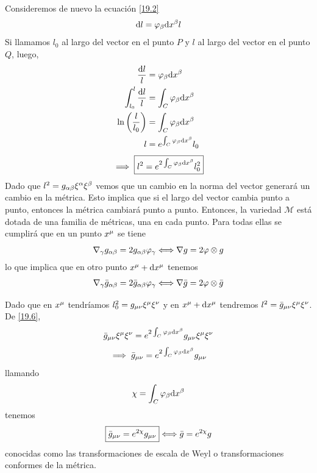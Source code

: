 Consideremos de nuevo la ecuación \eqref{19.2}
\begin{equation}\label{19.2}
  \dd l= \varphi_\beta \dd x^\beta l
\end{equation}
Si llamamos $l_0$ al largo del vector en el punto $P$ y $l$ al largo del vector en el punto $Q$, luego,
\begin{align}
  \frac{\dd l}{l}&=\varphi_\beta \dd x^\beta \\
  \int_{l_0}^l\frac{\dd l}{l}&=\int_C\varphi_\beta \dd x^\beta \\
  \ln\left(\frac{l}{l_0}\right)&=\int_C\varphi_\beta \dd x^\beta \\
  l&=e^{\int_C\varphi_\beta \dd x^\beta }l_0
\end{align}
\begin{equation}\label{19.6}
  \implies \boxed{l^2=e^{2\int_C\varphi_\beta \dd x^\beta }l^2_0}
\end{equation}
Dado que $l^2=g_{\alpha\beta }\xi^\alpha\xi^\beta $ vemos que un cambio en la norma del vector generará un cambio en la métrica. Esto implica que si el largo del vector cambia punto a punto, entonces la métrica cambiará punto a punto. Entonces, la variedad $\mathcal{M}$ está dotada de una familia de métricas, una en cada punto. Para todas ellas se cumplirá que en un punto $x^\mu $ se tiene
\begin{equation}\label{19.7}
  \nabla_\gamma g_{\alpha\beta }=2g_{\alpha\beta }\varphi_\gamma \Longleftrightarrow \nabla g=2\varphi\otimes g
\end{equation}
lo que implica que en otro punto $x^\mu +\dd x^\mu $ tenemos
\begin{align}\label{19.8}
  \nabla_\gamma \bar{g}_{\alpha\beta }=2\bar{g}_{\alpha\beta }\varphi_\gamma \Longleftrightarrow \nabla \bar{g}=2\varphi\otimes \bar{g}
\end{align}

Dado que en $x^\mu $ tendríamos $l_0^2=g_{\mu\nu }\xi^\mu\xi^\nu $ y en $x^\mu +\dd x^\mu $ tendremos $l^2=\bar{g}_{\mu\nu }\xi^\mu\xi^\nu $. De \eqref{19.6},
\begin{align}
  \bar{g}_{\mu\nu }\xi^\mu \xi^\nu =e^{2\int_C\varphi_\beta \dd x^\beta }g_{\mu\nu }\xi^\mu \xi^\nu
\end{align}
\begin{equation}
  \implies \bar{g}_{\mu\nu } =e^{2\int_C\varphi_\beta \dd x^\beta }g_{\mu\nu }
\end{equation}
llamando 
\begin{equation}
  \chi =\int_C\varphi_\beta \dd x^\beta 
\end{equation}
tenemos
\begin{equation}\label{19.9}
\boxed{  \bar{g}_{\mu\nu}=e^{2\chi }g_{\mu\nu }} \Longleftrightarrow \bar{g}=e^{2\chi }g
\end{equation}
conocidas como las transformaciones de escala de Weyl o transformaciones conformes de la métrica. 

